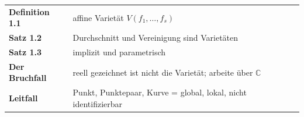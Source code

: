 \begin{merksatz}
\begin{center}
\renewcommand{\arraystretch}{1.5}
\begin{tabular}{@{}P{3.0cm}P{5.6cm}@{}}
\toprule
\textbf{Definition 1.1} & affine Varietät $V(f_1, \ldots, f_s)$\\
\textbf{Satz 1.2} & Durchschnitt und Vereinigung sind Varietäten\\
\textbf{Satz 1.3} & implizit und parametrisch\\
\textbf{Der Bruchfall} & reell gezeichnet ist nicht die Varietät; arbeite über $\mathbb C$\\
\textbf{Leitfall} & Punkt, Punktepaar, Kurve = global, lokal, nicht identifizierbar\\
\bottomrule
\end{tabular}
\end{center}

\begin{center}
\begin{minipage}{0.88\textwidth}
\end{minipage}
\end{center}
\end{merksatz}
